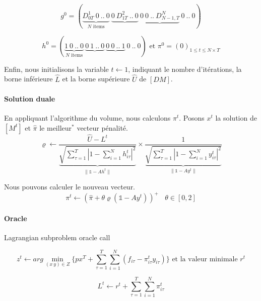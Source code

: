 \documentclass[12pt,a4paper]{article}
\begin{document}
 $$ g^0=(\underbrace{D^1_{0T}~0~..~0}_{N \text{ items}} ~ \underbrace{0~D^2_{1T}~..~0} ~ \underbrace{0~0~..~D^N_{N-1,T}} ~0~..~0) $$ 
 
 $$h^0=(\underbrace{1~0~..~0}_{N \text{ items}} ~ \underbrace{0~1~..~0} ~ \underbrace{0~0~..~1} ~0~..~0) \text{ et } \pi^0=(0)_{1 \leq t \leq N\times T} $$
 
 Enfin, nous initialisons la variable $t \leftarrow 1$, indiquant le nombre d'itérations, la borne inférieure $\hat{L}$ et la borne supérieure $\hat{U}$ de $[DM]$.
 
 \paragraph{Solution duale} En appliquant l'algorithme du volume, nous calculons $\pi^{t}$. Posons $x^t$ la solution de $[M^t]$ et $\hat{\pi}$ le meilleur$^*$ vecteur pénalité.
 $$\varrho \leftarrow  \dfrac{\hat{U}-L^t}{\underbrace{\sqrt{\sum_{\tau=1}^T  
 |1 - \sum_{i=1}^N h_{i \tau}^t|^2 }}_{\parallel \mathds{1} - Ah^t \parallel}} \times \dfrac{1}{\underbrace{\sqrt{\sum_{\tau=1}^T |1 - \sum_{i=1}^N y_{i \tau}^t|^2 }}_{\parallel \mathds{1} - Ay^t \parallel}}$$
 
 Nous pouvons calculer le nouveau vecteur.
 $$ \pi^t \leftarrow (\hat{\pi} + \theta \varrho (\mathds{1}-Ay^t))^+ ~~~~ \theta \in [0,2] $$
 
 \paragraph{Oracle} Lagrangian subproblem oracle call
 
 $$ z^t \leftarrow arg\min_{(x~y)\in Z}\{ px^T +  \sum_{\tau=1}^T \sum_{i=1}^N ( f_{i\tau} - \pi_{i\tau}^t y_{i\tau}) \} \text{ et la valeur minimale } r^t$$
 
 $$L^t \leftarrow r^t + \sum_{\tau=1}^T \sum_{i=1}^N \pi_{i\tau}^t$$
 
 
 
\end{document}
